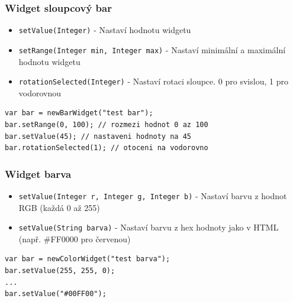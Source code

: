 \documentclass[12pt, a4paper, oneside]{article}
\newcommand{\It}{\textit}  %
\begin{document}
\subsubsection*{Widget sloupcový bar}
\begin{itemize}
    \item {\color{blue}\verb/setValue(Integer)/} - Nastaví hodnotu widgetu
    \item {\color{blue}\verb/setRange(Integer min, Integer max)/} - Nastaví minimální a maximální hodnotu widgetu
    \item {\color{blue}\verb/rotationSelected(Integer)/} - Nastaví rotaci sloupce. 0 pro svislou, 1 pro vodorovnou
\end{itemize}

\noindent\begin{minipage}{\textwidth}
\begin{lstlisting}[caption=Nastavení hodnot widgetu \It{sloupcový bar}]
var bar = newBarWidget("test bar");
bar.setRange(0, 100); // rozmezi hodnot 0 az 100
bar.setValue(45); // nastaveni hodnoty na 45
bar.rotationSelected(1); // otoceni na vodorovno
\end{lstlisting}
\end{minipage}

\subsubsection*{Widget barva}
\begin{itemize}
    \item {\color{blue}\verb/setValue(Integer r, Integer g, Integer b)/} - Nastaví barvu z hodnot RGB (každá 0 až 255)
    \item {\color{blue}\verb/setValue(String barva)/} - Nastaví barvu z hex hodnoty jako v HTML (např. \#FF0000 pro červenou)
\end{itemize}

\noindent\begin{minipage}{\textwidth}
\begin{lstlisting}[caption=Nastavení hodnot widgetu \It{barva}]
var bar = newColorWidget("test barva");
bar.setValue(255, 255, 0);
...
bar.setValue("#00FF00");
\end{lstlisting}
\end{minipage}
\end{document}
